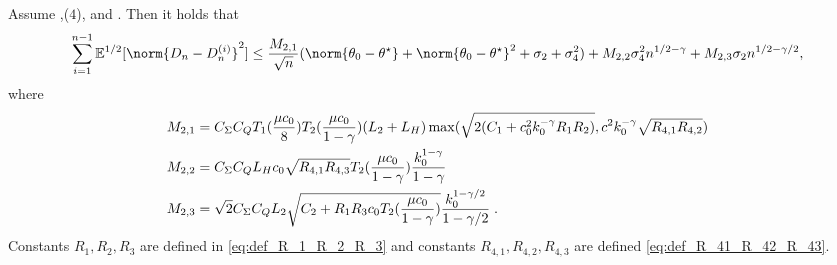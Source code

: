 \begin{lemma}
\label{lem:bound_sum_Dn-Dni}
        Assume ,($4$),  and . Then it holds that 
        \begin{equation}
            \sum_{i=1}^{n-1}\PE^{1/2}[\norm{D_n-D_n^{(i)}}^2] \leq \frac{M_{2,1}}{\sqrt{n}}(\norm{\theta_0-\thetas}+\norm{\theta_0-\thetas}^2+\sigma_2+ \sigma_4^2) + M_{2,2}\sigma_4^2n^{1/2-\gamma}+  M_{2,3}\sigma_2n^{1/2-\gamma/2},
        \end{equation}
            where 
    \begin{equation}
    \label{eq:def_const_M_2}
        \begin{split}         &M_{2,1}=C_{\Sigma}C_QT_1(\frac{\mu c_0}{8})T_2(\frac{\mu c_0}{1-\gamma})(L_2+L_H)\max(\sqrt{2(C_1+c_0^2k_0^{-\gamma}R_1R_2)},c^2k_0^{-\gamma}\sqrt{R_{4,1}R_{4,2}})\\&M_{2,2}=C_{\Sigma}C_QL_Hc_0\sqrt{R_{4,1}R_{4,3}}T_2(\frac{\mu c_0}{1-\gamma})\frac{k_0^{1-\gamma}}{1-\gamma}\\&M_{2,3}=\sqrt{2}C_{\Sigma}C_QL_2\sqrt{C_{2}+R_1R_3c_0T_2(\frac{\mu c_0}{1-\gamma})}\frac{k_0^{1-\gamma/2}}{1-\gamma/2} \;.
        \end{split}
    \end{equation}
    Constants $R_1, R_2, R_3$ are defined in \eqref{eq:def_R_1_R_2_R_3} and constants $R_{4,1}, R_{4,2}, R_{4,3}$ are defined \eqref{eq:def_R_41_R_42_R_43}.
\end{lemma}
